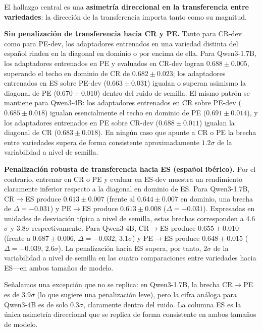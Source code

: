 \documentclass[conference]{IEEEtran}
\begin{document}
El hallazgo central es una \textbf{asimetría direccional en la transferencia
entre variedades}: la dirección de la transferencia importa tanto como su
magnitud.

\textbf{Sin penalización de transferencia hacia CR y PE.}
Tanto para CR-dev como para PE-dev, los adaptadores entrenados en una variedad
distinta del español rinden en la diagonal en dominio o por encima de ella.
Para Qwen3-1.7B, los adaptadores entrenados en PE y evaluados en CR-dev logran
$0.688\pm0.005$, superando el techo en dominio de CR de $0.682\pm0.023$;
los adaptadores entrenados en ES sobre PE-dev ($0.663\pm0.031$) igualan o superan
asimismo la diagonal de PE ($0.670\pm0.010$) dentro del ruido de semilla.
El mismo patrón se mantiene para Qwen3-4B: los adaptadores entrenados en CR sobre
PE-dev ($0.685\pm0.018$) igualan esencialmente el techo en dominio de PE
($0.691\pm0.014$), y los adaptadores entrenados en PE sobre CR-dev
($0.688\pm0.011$) igualan la diagonal de CR ($0.683\pm0.018$).
En ningún caso que apunte a CR o PE la brecha entre variedades supera de forma
consistente aproximadamente $1.2\sigma$ de la variabilidad a nivel de semilla.

\textbf{Penalización robusta de transferencia hacia ES (español ibérico).}
Por el contrario, entrenar en CR o PE y evaluar en ES-dev muestra un rendimiento
claramente inferior respecto a la diagonal en dominio de ES.
Para Qwen3-1.7B, CR$\rightarrow$ES produce $0.613\pm0.007$ (frente al
$0.644\pm0.007$ en dominio, una brecha de $\Delta=-0.031$) y PE$\rightarrow$ES
produce $0.613\pm0.008$ ($\Delta=-0.031$).
Expresadas en unidades de desviación típica a nivel de semilla, estas brechas
corresponden a 4.6$\sigma$ y 3.8$\sigma$ respectivamente.
Para Qwen3-4B, CR$\rightarrow$ES produce $0.655\pm0.010$
(frente a $0.687\pm0.006$, $\Delta=-0.032$, 3.1$\sigma$) y
PE$\rightarrow$ES produce $0.648\pm0.015$ ($\Delta=-0.039$, 2.6$\sigma$).
La penalización hacia ES supera, por tanto, 2$\sigma$ de la variabilidad a nivel
de semilla en las cuatro comparaciones entre variedades hacia ES---en ambos
tamaños de modelo.

Señalamos una excepción que no se replica: en Qwen3-1.7B,
la brecha CR$\rightarrow$PE es de 3.9$\sigma$ (lo que sugiere una penalización
leve), pero la cifra análoga para Qwen3-4B es de solo 0.3$\sigma$, claramente
dentro del ruido.
La columna ES es la única asimetría direccional que se replica de forma
consistente en ambos tamaños de modelo.
\end{document}
